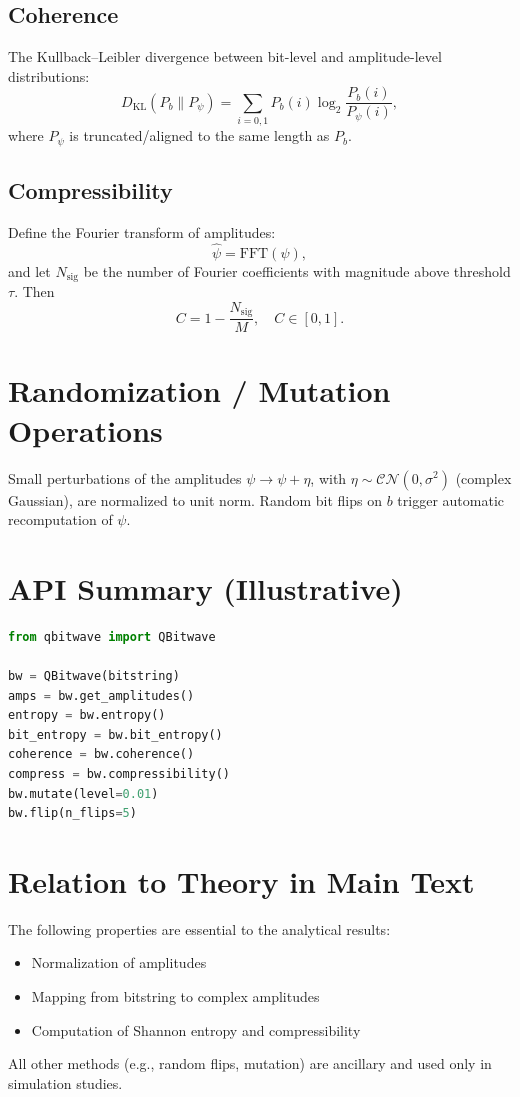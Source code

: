 \documentclass[11pt]{article}
\begin{document}
\subsection{Coherence}
The Kullback–Leibler divergence between bit-level and amplitude-level distributions:
\[
D_\text{KL}(P_b \parallel P_\psi) = \sum_{i=0,1} P_b(i) \log_2 \frac{P_b(i)}{P_\psi(i)},
\]
where $P_\psi$ is truncated/aligned to the same length as $P_b$.

\subsection{Compressibility}
Define the Fourier transform of amplitudes:
\[
\hat{\psi} = \text{FFT}(\psi),
\]
and let $N_\text{sig}$ be the number of Fourier coefficients with magnitude above threshold $\tau$. Then
\[
C = 1 - \frac{N_\text{sig}}{M}, \quad C \in [0,1].
\]

\section{Randomization / Mutation Operations}
Small perturbations of the amplitudes $\psi \to \psi + \eta$, with $\eta \sim \mathcal{CN}(0, \sigma^2)$ (complex Gaussian), are normalized to unit norm.  
Random bit flips on $b$ trigger automatic recomputation of $\psi$.

\section{API Summary (Illustrative)}
\begin{lstlisting}[language=Python]
from qbitwave import QBitwave

bw = QBitwave(bitstring)
amps = bw.get_amplitudes()
entropy = bw.entropy()
bit_entropy = bw.bit_entropy()
coherence = bw.coherence()
compress = bw.compressibility()
bw.mutate(level=0.01)
bw.flip(n_flips=5)
\end{lstlisting}

\section{Relation to Theory in Main Text}
The following properties are essential to the analytical results:
\begin{itemize}
    \item Normalization of amplitudes
    \item Mapping from bitstring to complex amplitudes
    \item Computation of Shannon entropy and compressibility
\end{itemize}
All other methods (e.g., random flips, mutation) are ancillary and used only in simulation studies.

\printbibliography
\end{document}
